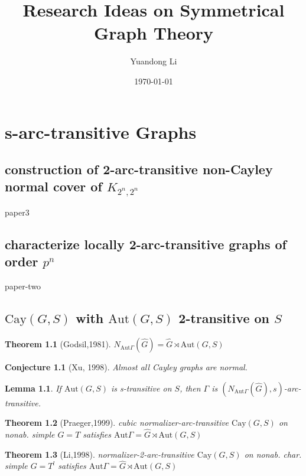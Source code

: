 \documentclass[a4paper,11pt,openany]{book}
\title{Research Ideas on Symmetrical Graph Theory}
\author{Yuandong Li}
\date{\today}
\newtheorem{theorem}{Theorem}[section]
\newtheorem{lemma}{Lemma}[theorem]
\newtheorem{conjecture}{Conjecture}[section]
\def\Aut{\mathrm{Aut}}
\def\Cay{\mathrm{Cay}}
\begin{document}
\maketitle

\tableofcontents


\chapter{s-arc-transitive Graphs}
\section{construction of 2-arc-transitive non-Cayley normal cover of $K_{2^n,2^n}$}
paper3


\section{characterize locally 2-arc-transitive graphs of order $p^n$}
paper-two



\section{$\Cay(G,S)$ with $\Aut(G,S)$ 2-transitive on $S$}

\begin{theorem}[Godsil,1981]
	$N_{\Aut\Gamma}(\hat{G})=\hat{G}\rtimes \Aut(G,S)$
\end{theorem}

\begin{conjecture}[Xu, 1998]
	Almost all Cayley graphs are normal.
\end{conjecture}


\begin{lemma}
	If $\Aut(G,S)$ is s-transitive on $S$, then $\Gamma$ is $(N_{\Aut\Gamma}(\hat{G}),s)$-arc-transitive.
\end{lemma}

\begin{theorem}[Praeger,1999]
	cubic normalizer-arc-transitive $\Cay(G,S)$ on nonab. simple $G=T$ satisfies $\Aut\Gamma=\hat{G}\rtimes \Aut(G,S)$
\end{theorem}

\begin{theorem}[Li,1998]
	normalizer-2-arc-transitive  $\Cay(G,S)$ on nonab. char. simple $G=T^l$ satisfies $\Aut\Gamma=\hat{G}\rtimes \Aut(G,S)$
\end{theorem}
\end{document}

